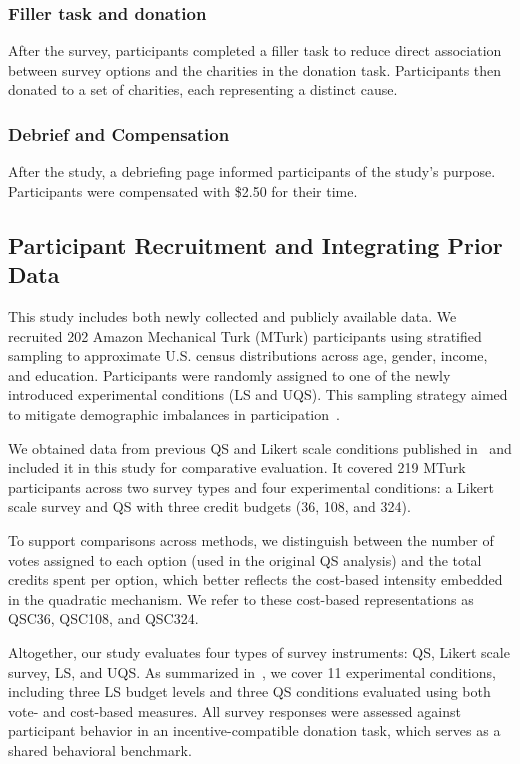 \subsubsection{Filler task and donation}
After the survey, participants completed a filler task to reduce direct association between survey options and the charities in the donation task. Participants then donated to a set of charities, each representing a distinct cause.

\subsubsection{Debrief and Compensation}
After the study, a debriefing page informed participants of the study’s purpose. Participants were compensated with \$2.50 for their time.

\subsection{Participant Recruitment and Integrating Prior Data}
This study includes both newly collected and publicly available data. We recruited 202 Amazon Mechanical Turk (MTurk) participants using stratified sampling to approximate U.S. census distributions across age, gender, income, and education. Participants were randomly assigned to one of the newly introduced experimental conditions (LS and UQS). This sampling strategy aimed to mitigate demographic imbalances in participation~\cite{redmilesHowWellMy2019}.

We obtained data from previous QS and Likert scale conditions published in~\cite{chengCanShowWhat2021} and included it in this study for comparative evaluation. It covered 219 MTurk participants across two survey types and four experimental conditions: a Likert scale survey and QS with three credit budgets (36, 108, and 324).

To support comparisons across methods, we distinguish between the number of votes assigned to each option (used in the original QS analysis) and the total credits spent per option, which better reflects the cost-based intensity embedded in the quadratic mechanism. We refer to these cost-based representations as QSC36, QSC108, and QSC324.

Altogether, our study evaluates four types of survey instruments: QS, Likert scale survey, LS, and UQS. As summarized in~, we cover 11 experimental conditions, including three LS budget levels and three QS conditions evaluated using both vote- and cost-based measures. All survey responses were assessed against participant behavior in an incentive-compatible donation task, which serves as a shared behavioral benchmark.

